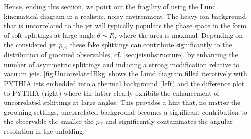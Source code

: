 Hence, ending this section, we point out the fragility of using the Lund kinematical diagram in a realistic, noisy environment.
The heavy ion background that is uncorrelated to the jet will typically populate the phase space in the form of soft splittings at large angle $\theta \sim R$, where the area is maximal. Depending on the considered jet $p_{T}$, these fake splittings can contribute significantly to the distribution of groomed observables, cf. \autoref{sec:jetsubstructure}, by enhancing the number of asymmetric splittings and inducing a strong modification relative to vacuum jets. 
\autoref{fig:UncorrelatedBkg} shows the Lund diagram filled iteratively with PYTHIA jets embedded into a thermal background (left) and the difference plot to PYTHIA (right) where the latter clearly exhibits the enhancement of uncorrelated splittings at large angles. 
This provides a hint that, no matter the grooming settings, uncorrelated background becomes a significant contribution to the observable the smaller the $p_{\text{\tiny T}}$ and significantly contaminates the angular resolution in the unfolding.

